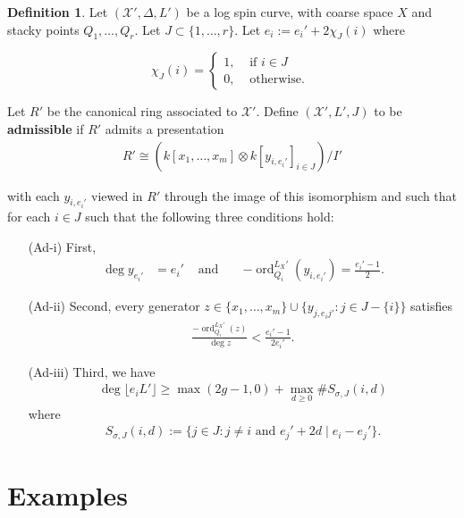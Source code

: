 \documentclass{amsart}
\makeatletter
\theoremstyle{plain}
\theoremstyle{definition}
\newtheorem{defn}[thm]{Definition}
\theoremstyle{remark}
\numberwithin{equation}{section}
\DeclareMathOperator{\ord}{ord}
\newcommand\sx{\mathscr X}
\newcommand \subhalf[1]{\frac{{#1} - 1}{2{#1}}}
\newcommand{\halfcan}{L}
\newcommand{\customlabel}[2]{%
   \protected@write \@auxout {}{\string \newlabel {#1}{{#2}{\thepage}{#2}{#1}{}} }%
   \hypertarget{#1}{#2}
}
\makeatother
\begin{document}
\begin{defn}
\label{defn:admissible}
Let $(\sx', \Delta, L')$ be a log spin
curve, with coarse space $X$ and stacky points $Q_1, \ldots, Q_r$.  Let $J \subset
\{1, \ldots, r\}$. Let $e_i := e_i'+ 2 \chi_J (i)$ where

\[
\chi_J(i) = \begin{cases}
	1, &\text{ if }i \in J\\
	0, &\text{ otherwise. } 
\end{cases}
\]

Let $R'$ be the canonical ring associated to $\sx'$. Define $(\sx',L',J)$
to be {\bf admissible} if $R'$ admits a presentation
\begin{align*}
	R' \cong \left( k[x_1, \ldots, x_m] \otimes k[y_{i, e_i'}]_{i \in J} \right)/I'
\end{align*}

\noindent
with each $y_{i, e_i'}$ viewed in $R'$ through the image of this isomorphism and such that for each $i \in J$ such that the following
three conditions hold:
\begin{enumerate}
	\item[\customlabel{Ad-i}{(Ad-i)}] First, 
	\begin{align*}
	\deg y_{e_i'} &= e_i'  &\text{ and } &&-\ord_{Q_i}^{\halfcan_X'}(y_{i, e_i'})
		= \frac{e_i'- 1}{2}.
	\end{align*}
		\item[\customlabel{Ad-ii}{(Ad-ii)}] Second, every generator $z \in \{x_1, \ldots, x_m\} \cup \{y_{j,e_ij'}: j\in J - \{i\} \}$ satisfies
		\begin{align*}
			\frac{-\ord_{Q_i}
^{\halfcan_X'}(z)}{\deg z} < \subhalf {e_i'}.
		\end{align*}
	\item[\customlabel{Ad-iii}{(Ad-iii)}] Third, we have
		\begin{align*}
			\deg \lfloor e_i L' \rfloor \geq \max(2g - 1,0) + \max_{d \geq 0} \# S_{\sigma, J}(i, d)
		\end{align*}
		where
		\begin{align*}
			S_{\sigma, J}(i, d) := \{j \in J : j \neq i \text{ and } e_j'+2d
			\mid e_i - e_j'\}.
		\end{align*}
\end{enumerate}
\end{defn}


\section{Examples}
\label{sec:examples}
\end{document}
